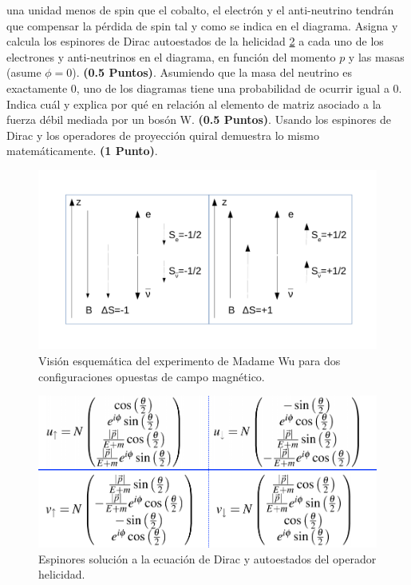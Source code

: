 \documentclass[paper=a4, fontsize=11pt]{scrartcl} %
\numberwithin{equation}{section} %
\numberwithin{figure}{section} %
\numberwithin{table}{section} %
\begin{document}
una unidad menos de spin que el cobalto, el electrón y el anti-neutrino tendrán que compensar la pérdida de spin tal y como se indica en el diagrama. Asigna y calcula los espinores de Dirac autoestados de la helicidad \ref{espinores} a cada uno de los electrones y anti-neutrinos en el diagrama, en función del momento $p$ y las masas (asume $\phi=0$). \textbf{(0.5 Puntos)}. Asumiendo que la masa del neutrino es exactamente 0, uno de los diagramas tiene una probabilidad de ocurrir igual a 0. Indica cuál y explica por qué en relación al elemento de matriz asociado a la fuerza débil mediada por un bosón W. \textbf{(0.5 Puntos)}. Usando los espinores de Dirac y los operadores de proyección quiral demuestra lo mismo matemáticamente. \textbf{(1 Punto)}.  

\begin{figure}[!h]
\begin{center}
\includegraphics[width=0.6\linewidth]{DibujoExamen.pdf}
\end{center}
\caption{Visión esquemática del experimento de Madame Wu para dos configuraciones opuestas de campo magnético.}
\label{dibujo}
\end{figure}

\begin{figure}[!h]
\begin{center}
\includegraphics[width=0.6\linewidth]{espinores.png}
\end{center}
\caption{Espinores solución a la ecuación de Dirac y autoestados del operador helicidad.}
\label{espinores}
\end{figure}
\end{document}
